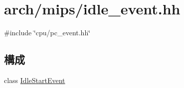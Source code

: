 \hypertarget{mips_2idle__event_8hh}{
\section{arch/mips/idle\_\-event.hh}
\label{mips_2idle__event_8hh}
}
{\ttfamily \#include \char`\"{}cpu/pc\_\-event.hh\char`\"{}}\par
\subsection*{構成}
\begin{DoxyCompactItemize}
\item 
class \hyperlink{classIdleStartEvent}{IdleStartEvent}
\end{DoxyCompactItemize}
